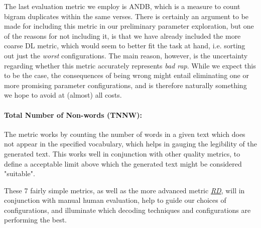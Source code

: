 The last evaluation metric we employ is ANDB, which is a measure to count bigram duplicates within the same verses. There is certainly an argument to be made for including this metric in our preliminary parameter exploration, but one of the reasons for not including it, is that we have already included the more coarse DL metric, which would seem to better fit the task at hand, i.e. sorting out just the \textit{worst} configurations. The main reason, however, is the uncertainty regarding whether this metric accurately represents \textit{bad rap}. While we expect this to be the case, the consequences of being wrong might entail eliminating one or more promising parameter configurations, and is therefore naturally something we hope to avoid at (almost) all costs.

\paragraph{Total Number of Non-words (TNNW):\\[6pt]}
\label{total-non-words}

The metric works by counting the number of words in a given text which does not appear in the specified vocabulary, which helps in gauging the legibility of the generated text. This works well in conjunction with other quality metrics, to define a acceptable limit above which the generated text might be considered "suitable".

These 7 fairly simple metrics, as well as the more advanced metric \hyperref[sec:rhyme-density]{\textit{RD}}, will in conjunction with manual human evaluation, help to guide our choices of configurations, and illuminate which decoding techniques and configurations are performing the best.



